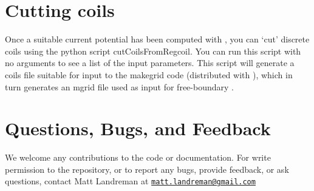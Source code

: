 \section{Cutting coils}

Once a suitable current potential has been computed with \regcoil, you can `cut' discrete coils
using the python script {\ttfamily cutCoilsFromRegcoil}. You can run this script with no arguments
to see a list of the input parameters. This script will generate a coils file suitable for input to the
{\ttfamily makegrid} code (distributed with \vmec), which in turn generates an mgrid file used as input for free-boundary \vmec.

\section{Questions, Bugs, and Feedback}

We welcome any contributions to the code or documentation.
For write permission to the repository, or to report any bugs, provide feedback, or ask questions, contact Matt Landreman at
\href{mailto:matt.landreman@gmail.com}{\nolinkurl{matt.landreman@gmail.com} }






